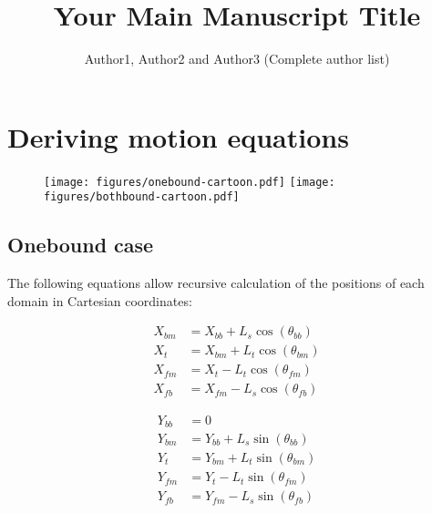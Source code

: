 \documentclass[9pt,twoside,lineno]{pnas-new}
\title{Your Main Manuscript Title}
\author{Author1, Author2 and Author3 (Complete author list)}
\begin{document}
\instructionspage  

\maketitle

\SItext


\section*{Deriving motion equations}

\begin{figure}[tbhp]
\centering
\texttt{[image: figures/onebound-cartoon.pdf]}
\texttt{[image: figures/bothbound-cartoon.pdf]}
\caption{}
\label{fig:supp-model}
\end{figure}


\subsection*{Onebound case}
The following equations allow recursive calculation of the positions of each domain in Cartesian coordinates:

\noindent\begin{minipage}{0.49\linewidth}
\begin{align}
  X_{bm} &= X_{bb}+L_{s}\cos(\theta_{bb}) \\
  X_{t}  &= X_{bm}+L_{t}\cos(\theta_{bm}) \\
  X_{fm} &= X_{t} - L_{t}\cos(\theta_{fm}) \\
  X_{fb} &= X_{fm} - L_{s}\cos(\theta_{fb})
\end{align}
\end{minipage}
\begin{minipage}{0.49\linewidth}
\begin{align}
  Y_{bb} &= 0 \\
  Y_{bm} &= Y_{bb}+L_{s}\sin(\theta_{bb}) \\
  Y_{t}  &= Y_{bm}+L_{t}\sin(\theta_{bm}) \\
  Y_{fm} &= Y_{t} - L_{t}\sin(\theta_{fm}) \\
  Y_{fb} &= Y_{fm} - L_{s}\sin(\theta_{fb})
\end{align}
\end{minipage}
\vspace{.5cm}
\end{document}
